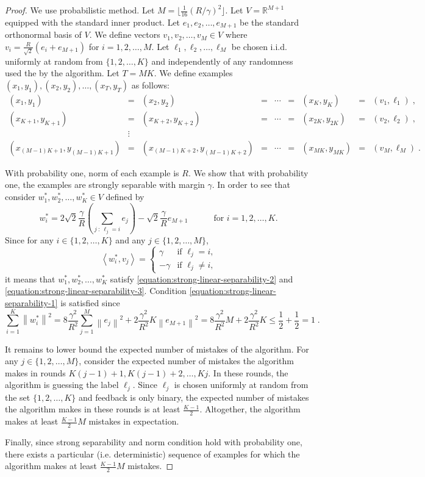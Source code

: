 \documentclass[12pt]{article}
\newcommand{\R}{\mathbb{R}}  %
\newcommand{\ip}[2]{\left\langle #1, #2 \right\rangle} %
\newcommand{\norm}[1]{\left\| #1 \right\|}  %
\begin{document}
\begin{proof}
We use probabilistic method. Let $M = \lfloor \frac{1}{16} (R/\gamma)^2 \rfloor$.
Let $V = \R^{M+1}$ equipped with the standard inner product.  Let $e_1, e_2,
\dots, e_{M+1}$ be the standard orthonormal basis of $V$. We define
vectors $v_1, v_2, \dots, v_M \in V$ where $v_i = \frac{R}{\sqrt{2}}(e_i +
e_{M+1})$ for $i=1,2,\dots,M$. Let $\ell_1, \ell_2, \dots, \ell_M$ be chosen
i.i.d. uniformly at random from $\{1,2,\dots,K\}$ and independently of any
randomness used the by the algorithm. Let $T = M K$. We define examples $(x_1,
y_1), (x_2, y_2), \dots, (x_T, y_T)$ as follows:
$$
\begin{array}{lclclclcl}
(x_1, y_1) & = & (x_2, y_2) & = & \cdots & = & (x_K, y_K) & = & (v_1, \ell_1) \; , \\
(x_{K+1},y_{K+1}) & = & (x_{K+2}, y_{K+2}) & = & \cdots & = & (x_{2K}, y_{2K}) & = & (v_2, \ell_2) \; , \\
& \vdots & \\
(x_{(M-1)K+1}, y_{(M-1)K+1})  & = & (x_{(M-1)K+2}, y_{(M-1)K+2}) & = & \cdots & = & (x_{MK}, y_{MK}) & = & (v_M, \ell_M) \; .
\end{array}
$$

With probability one, norm of each example is $R$. We show that with probability
one, the examples are strongly separable with margin $\gamma$. In order to see
that consider $w_1^*, w_2^*, \dots, w_K^* \in V$ defined by
$$
w_i^* = 2 \sqrt{2} \frac{\gamma}{R} \left( \sum_{j ~:~ \ell_j = i} e_j \right) - \sqrt{2} \frac{\gamma}{R} e_{M+1} \qquad \quad \text{for $i=1,2,\dots,K$.}
$$
Since for any $i \in \{1,2,\dots,K\}$ and any $j \in \{1,2,\dots,M\}$,
$$
\ip{w_i^*}{v_j} =
\begin{cases}
\gamma & \text{if $\ell_j = i$,} \\
- \gamma & \text{if $\ell_j \neq i$,}
\end{cases}
$$
it means that $w_1^*, w_2^*, \dots, w_K^*$ satisfy
\eqref{equation:strong-linear-separability-2} and
\eqref{equation:strong-linear-separability-3}. Condition \eqref{equation:strong-linear-separability-1}
is satisfied since
$$
\sum_{i=1}^K \norm{w_i^*}^2
= 8 \frac{\gamma^2}{R^2} \sum_{j=1}^M \norm{e_j}^2 + 2 \frac{\gamma^2}{R^2} K \norm{e_{M+1}}^2
= 8 \frac{\gamma^2}{R^2} M + 2 \frac{\gamma^2}{R^2} K
\le \frac{1}{2} + \frac{1}{2}
= 1 \; .
$$

It remains to lower bound the expected number of mistakes of the algorithm. For
any $j \in \{1,2,\dots,M\}$, consider the expected number of mistakes the
algorithm makes in rounds $K(j-1) + 1, K(j-1) + 2, \dots, Kj$. In these rounds,
the algorithm is guessing the label $\ell_j$. Since $\ell_j$ is chosen uniformly
at random from the set $\{1,2,\dots,K\}$ and feedback is only binary, the
expected number of mistakes the algorithm makes in these rounds is at least
$\frac{K-1}{2}$. Altogether, the algorithm makes at least $\frac{K-1}{2} M$
mistakes in expectation.

Finally, since strong separability and norm condition hold with probability one,
there exists a particular (i.e. deterministic) sequence of examples for which
the algorithm makes at least $\frac{K-1}{2} M$ mistakes.
\end{proof}
\end{document}
